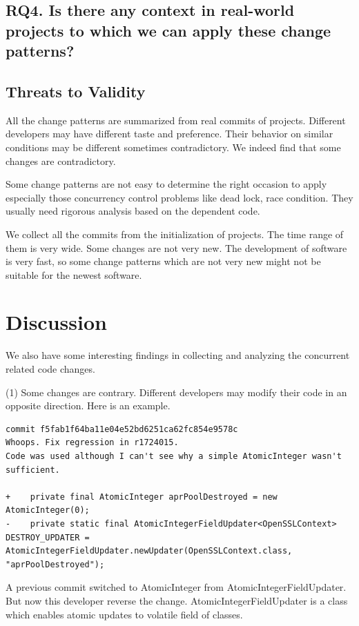 \documentclass[conference]{IEEEtran}
\begin{document}
\subsection{RQ4. Is there any context in real-world projects to which we can apply these change patterns?}


\subsection{Threats to Validity}

All the change patterns are summarized from real commits of projects. Different developers may have different taste and preference. Their behavior on similar conditions may be different sometimes contradictory. We indeed find that some changes are contradictory.

Some change patterns are not easy to determine the right occasion to apply especially those concurrency control problems like dead lock, race condition. They usually need rigorous analysis based on the dependent code.

We collect all the commits from the initialization of projects. The time range of them is very wide. Some changes are not very new. The development of software is very fast, so some change patterns which are not very new might not be suitable for the newest software.

\section{Discussion}
We also have some interesting findings in collecting and analyzing the concurrent related code changes.

(1) Some changes are contrary. Different developers may modify their code in an opposite direction. Here is an example.

\begin{lstlisting}
commit f5fab1f64ba11e04e52bd6251ca62fc854e9578c
Whoops. Fix regression in r1724015.
Code was used although I can't see why a simple AtomicInteger wasn't sufficient.

+    private final AtomicInteger aprPoolDestroyed = new AtomicInteger(0);
-    private static final AtomicIntegerFieldUpdater<OpenSSLContext> DESTROY_UPDATER = AtomicIntegerFieldUpdater.newUpdater(OpenSSLContext.class, "aprPoolDestroyed");
\end{lstlisting}

A previous commit switched to AtomicInteger from AtomicIntegerFieldUpdater. But now this developer reverse the change. AtomicIntegerFieldUpdater is a class which enables atomic updates to volatile field of classes.
\end{document}
